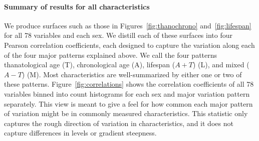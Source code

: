 \documentclass[11pt,oneside]{article} %
\begin{document}
\paragraph{Summary of results for all characteristics}
We produce surfaces such as those in Figures~\ref{fig:thanochrono}
and~\ref{fig:lifespan} for all 78 variables and each sex. We distill each
of these surfaces into four Pearson correlation coefficients, each designed to
capture the variation along each of the four major patterns explained above. We
call the four patterns thanatological age (T), chronological age (A), lifespan
($A+T$) (L), and mixed ($A-T$) (M). Most characteristics are
well-summarized by either one or two of these patterns.
Figure~\ref{fig:correlations} shows the correlation coefficients of all 78
variables binned into count histograms for each sex and major variation pattern
separately. This view is meant to give a feel for how common each major
pattern of variation might be in commonly measured characteristics. This
statistic only captures the rough direction of variation in characteristics, and
it does not capture differences in levels or gradient steepness.
\end{document}
